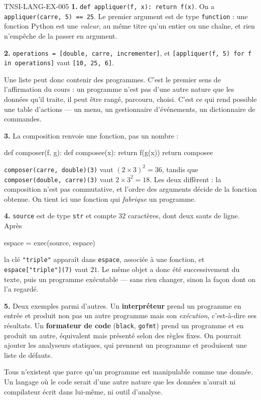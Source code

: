 \begin{corrige}{TNSI-LANG-EX-005}
\textbf{1.} \lstinline{def appliquer(f, x): return f(x)}. On a
\lstinline{appliquer(carre, 5) == 25}. Le premier argument est de type
\lstinline{function} : une fonction Python est une \emph{valeur}, au même titre
qu'un entier ou une chaîne, et rien n'empêche de la passer en argument.

\textbf{2.} \lstinline{operations = [double, carre, incrementer]}, et
\lstinline{[appliquer(f, 5) for f in operations]} vaut
\lstinline{[10, 25, 6]}.

Une liste peut donc contenir des programmes. C'est le premier sens de
l'affirmation du cours : un programme n'est pas d'une autre nature que les
données qu'il traite, il peut être rangé, parcouru, choisi. C'est ce qui rend
possible une table d'actions — un menu, un gestionnaire d'événements, un
dictionnaire de commandes.

\textbf{3.} La composition renvoie une fonction, pas un nombre :
\begin{python}
def composer(f, g):
    def composee(x):
        return f(g(x))
    return composee
\end{python}
\lstinline{composer(carre, double)(3)} vaut $\left(2\times 3\right)^2=36$, tandis
que \lstinline{composer(double, carre)(3)} vaut $2\times 3^2=18$. Les deux
diffèrent : la composition n'est pas commutative, et l'ordre des arguments décide
de la fonction obtenue. On tient ici une fonction qui \emph{fabrique} un
programme.

\textbf{4.} \lstinline{source} est de type \lstinline{str} et compte $32$
caractères, dont deux sauts de ligne. Après
\begin{python}
espace = {}
exec(source, espace)
\end{python}
la clé \lstinline{"triple"} apparaît dans \lstinline{espace}, associée à une
fonction, et \lstinline{espace["triple"](7)} vaut $21$. Le même objet a donc été
successivement du texte, puis un programme exécutable — sans rien changer, sinon
la façon dont on l'a regardé.

\textbf{5.} Deux exemples parmi d'autres. Un \textbf{interpréteur} prend un
programme en entrée et produit non pas un autre programme mais son
\emph{exécution}, c'est-à-dire ses résultats. Un \textbf{formateur de code}
(\lstinline{black}, \lstinline{gofmt}) prend un programme et en produit un autre,
équivalent mais présenté selon des règles fixes. On pourrait ajouter les
analyseurs statiques, qui prennent un programme et produisent une liste de
défauts.

Tous n'existent que parce qu'un programme est manipulable comme une donnée. Un
langage où le code serait d'une autre nature que les données n'aurait ni
compilateur écrit dans lui-même, ni outil d'analyse.
\end{corrige}
